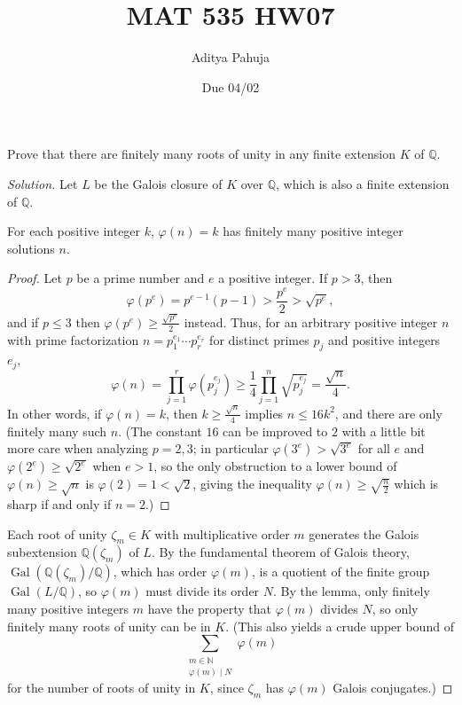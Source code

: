\documentclass[10pt]{article}
\title{MAT 535 HW07}
\author{\large Aditya Pahuja}
\date{\large Due 04/02}
\providecommand{\Gal}{\operatorname{Gal}}
\providecommand{\NN}{\mathbb N}
\providecommand{\QQ}{\mathbb Q}
\newenvironment{soln}{\begin{proof}[Solution]}{\end{proof}}
\begin{document}
\maketitle

\begin{problem}
    [\S13.6\#5]
    Prove that there are finitely many roots of unity
    in any finite extension $K$ of $\QQ$.
\end{problem}

\begin{soln}
    Let $L$ be the Galois closure of $K$ over $\QQ$,
    which is also a finite extension of $\QQ$.

    \begin{lemma}
        For each positive integer $k$, $\varphi(n) = k$
	has finitely many positive integer solutions $n$.
    \end{lemma}
    \begin{proof}
	Let $p$ be a prime number and $e$ a positive integer.
	If $p > 3$, then
	\begin{equation*}
	    \varphi(p^e) = p^{e-1}(p-1) > \frac{p^e}2 > \sqrt{p^e},
	\end{equation*}
	and if $p \le 3$ then $\varphi(p^e) \ge\frac{\sqrt{p^e}}2$ instead.
	Thus, for an arbitrary positive integer $n$
	with prime factorization $n = p_1^{e_1}\cdots p_r^{e_r}$
	for distinct primes $p_j$ and positive integers $e_j$,
	\begin{equation*}
	    \varphi(n) = \prod_{j=1}^r \varphi(p_j^{e_j})
	    \ge \frac 14\prod_{j=1}^n \sqrt{p_j^{e_j}} = \frac{\sqrt n}4.
	\end{equation*}
	In other words, if $\varphi(n) = k$, then
	$k\ge\frac{\sqrt n}4$ implies $n \le 16k^2$,
	and there are only finitely many such $n$.
	(The constant $16$ can be improved to $2$
	with a little bit more care
	when analyzing $p = 2,3$;
	in particular $\varphi(3^e) > \sqrt{3^e}$ for all $e$
	and $\varphi(2^e) \ge \sqrt{2^e}$ when $e > 1$,
	so the only obstruction to a lower bound of $\varphi(n)\ge \sqrt n$     
	is $\varphi(2) = 1 < \sqrt 2$,
	giving the inequality $\varphi(n) \ge \sqrt{\frac n2}$
	which is sharp if and only if $n = 2$.)
    \end{proof}

    Each root of unity $\zeta_m\in K$ with multiplicative order $m$
    generates the Galois subextension $\QQ(\zeta_m)$ of $L$.
    By the fundamental theorem of Galois theory, $\Gal(\QQ(\zeta_m)/\QQ)$,
    which has order $\varphi(m)$,
    is a quotient of the finite group $\Gal(L/\QQ)$,
    so $\varphi(m)$ must divide its order $N$.
    By the lemma, only finitely many positive integers $m$
    have the property that $\varphi(m)$ divides $N$,
    so only finitely many roots of unity can be in $K$.
    (This also yields a crude upper bound of
    \begin{equation*}
	\sum_{\substack{m\in\NN\\ \varphi(m)\mid N}} \varphi(m)
    \end{equation*}
    for the number of roots of unity in $K$,
    since $\zeta_m$ has $\varphi(m)$ Galois conjugates.)
\end{soln}
\end{document}
